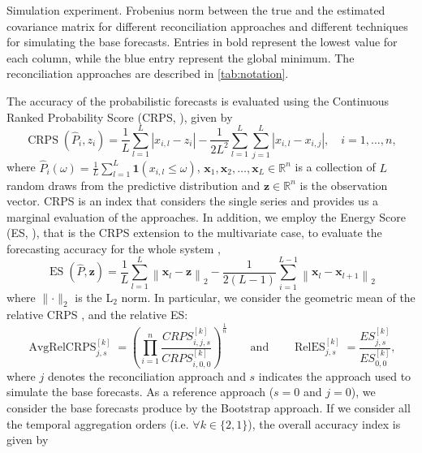 \documentclass[12pt]{article}
\newcommand{\xvet}{\bm{x}}
\newcommand{\zvet}{\bm{z}}
\theoremstyle{definition}
\begin{document}
\begin{table}[!th]
	\centering
	\begingroup
	\fontsize{9}{11}\selectfont
	
	\endgroup
	\caption{Simulation experiment. Frobenius norm between the true and the estimated covariance matrix for different reconciliation approaches and different techniques for simulating the base forecasts. Entries in bold represent the lowest value for each column, while the blue entry represent the global minimum. The reconciliation approaches are described in \autoref{tab:notation}.}
	\label{tab:ar2norm}
\end{table}

The accuracy of the probabilistic forecasts is evaluated using the Continuous Ranked Probability Score (CRPS, \citealp{gneiting2014}), given by
\begin{equation}\label{eq:crps}
	\operatorname{CRPS}(\widehat{P}_i, z_i)=\frac{1}{L} \sum_{l=1}^{L}\left|x_{i,l}-z_i\right|-\frac{1}{2 L^{2}} \sum_{l=1}^{L} \sum_{j=1}^{L}\left|x_{i,l}-x_{i,j}\right|, \quad i = 1,\dots,n,
\end{equation}
where $\widehat{P}_i(\omega)=\displaystyle\frac{1}{L} \sum_{l=1}^{L} \mathbf{1}\left(x_{i,l} \leq \omega\right)$, $\xvet_{1}, \xvet_{2}, \dots, \xvet_{L}\in \mathbb{R}^{n}$ is a collection of $L$ random draws from the predictive distribution and $\zvet \in \mathbb{R}^{n}$ is the observation vector. CRPS is an index that considers the single series and provides us a marginal evaluation of the approaches. In addition, we employ the Energy Score (ES, \citealp{gneiting2014}), that is the CRPS extension to the multivariate case, to evaluate the forecasting accuracy for the whole system \citep{panagiotelis2023, wickramasuriya2021b},
\begin{equation}\label{eq:es}
	\operatorname{ES}(\widehat{P}, \zvet)=\frac{1}{L} \sum_{l=1}^{L}\left\|\xvet_{l}-\zvet\right\|_{2}-\frac{1}{2(L-1)} \sum_{i=1}^{L-1}\left\|\xvet_{l}-\xvet_{l+1}\right\|_{2}
\end{equation}
where $	\lVert \cdot \rVert_2$ is the L$_2$ norm. In particular, we consider the geometric mean of the relative CRPS \citep{fleming1986}, and the relative ES:
\begin{equation}\label{eq:skill}
	\operatorname{AvgRelCRPS}_{j,s}^{[k]} = \left(\prod_{i = 1}^n \frac{CRPS^{[k]}_{i, j, s}}{CRPS^{[k]}_{i, 0, 0}}\right)^{\frac{1}{n}} \qquad \mathrm{and} \qquad \operatorname{RelES}_{j,s}^{[k]} = \frac{ES^{[k]}_{j, s}}{ES^{[k]}_{0, 0}},
\end{equation}
where $j$ denotes the reconciliation approach and $s$ indicates the approach used to simulate the base forecasts. As a reference approach ($s=0$ and $j=0$), we consider the base forecasts produce by the Bootstrap approach. If we consider all the temporal aggregation orders (i.e. $\forall k \in \{2,1\}$), the overall accuracy index is given by
\end{document}

